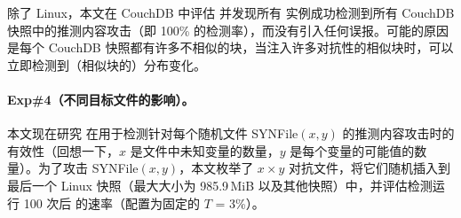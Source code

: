 除了 Linux，本文在 CouchDB 中评估 \sysnameF 并发现所有 \sysnameF 实例成功检测到所有 CouchDB 快照中的推测内容攻击（即 100\% 的检测率），而没有引入任何误报。可能的原因是每个 CouchDB 快照都有许多不相似的块，当注入许多对抗性的相似块时，\sysnameF 可以立即检测到（相似块的）分布变化。


\paragraph*{Exp\#4（不同目标文件的影响）。}
本文现在研究 \sysnameF 在用于检测针对每个随机文件 SYNFile$(x, y)$ 的推测内容攻击时的有效性（回想一下，$x$ 是文件中未知变量的数量，$y $ 是每个变量的可能值的数量）。为了攻击 SYNFile$(x, y)$，本文枚举了 $x\times y$ 对抗文件，将它们随机插入到最后一个 Linux 快照（最大大小为 985.9\,MiB 以及其他快照）中，并评估检测运行 100 次后 \sysnameF 的速率（配置为固定的 $T$ = 3\%）。


